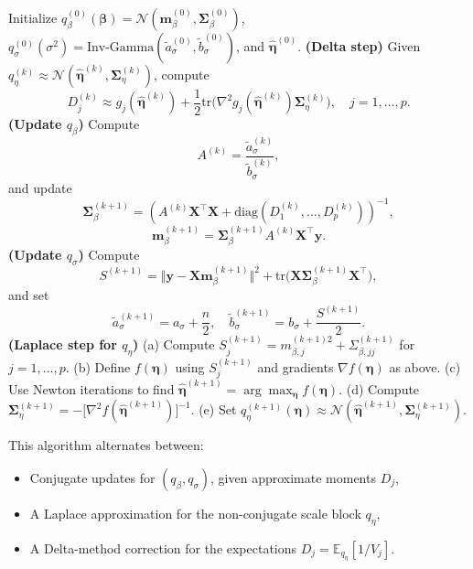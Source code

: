 \documentclass[11pt]{article}
\newcommand{\vect}[1]{\boldsymbol{#1}}
\newcommand{\mat}[1]{\mathbf{#1}}
\newcommand{\E}{\mathbb{E}}
\newcommand{\IG}{\mathrm{Inv\text{-}Gamma}}
\newcommand{\N}{\mathcal{N}}
\begin{document}
\begin{algorithm}[h]
\caption{VB with Laplace--Delta (VB--LD) for Regularized Horseshoe Regression}
\begin{algorithmic}[1]
\State Initialize $q_\beta^{(0)}(\vect{\beta}) = \N(\vect{m}_\beta^{(0)},\mat{\Sigma}_\beta^{(0)})$, 
       $q_\sigma^{(0)}(\sigma^2) = \IG(\tilde{a}_\sigma^{(0)},\tilde{b}_\sigma^{(0)})$,
       and $\hat{\vect{\eta}}^{(0)}$.
  \State \textbf{(Delta step)} Given $q_\eta^{(k)} \approx \N(\hat{\vect{\eta}}^{(k)},\mat{\Sigma}_\eta^{(k)})$, compute
    \[
      D_j^{(k)} \approx g_j(\hat{\vect{\eta}}^{(k)}) 
      + \frac12 \mathrm{tr}\big(\nabla^2 g_j(\hat{\vect{\eta}}^{(k)}) \mat{\Sigma}_\eta^{(k)}\big),
      \quad j=1,\dots,p.
    \]
  \State \textbf{(Update $q_\beta$)} Compute
    \[
      A^{(k)} = \frac{\tilde{a}_\sigma^{(k)}}{\tilde{b}_\sigma^{(k)}},
    \]
    and update
    \[
      \mat{\Sigma}_\beta^{(k+1)} 
      = \left(A^{(k)}\mat{X}^\top\mat{X} + \mathrm{diag}(D_1^{(k)},\dots,D_p^{(k)})\right)^{-1},
    \]
    \[
      \vect{m}_\beta^{(k+1)} 
      = \mat{\Sigma}_\beta^{(k+1)} A^{(k)} \mat{X}^\top \vect{y}.
    \]
  \State \textbf{(Update $q_\sigma$)} Compute
    \[
      S^{(k+1)} = \Vert \vect{y} - \mat{X}\vect{m}_\beta^{(k+1)} \Vert^2
      + \mathrm{tr}\big(\mat{X}\mat{\Sigma}_\beta^{(k+1)}\mat{X}^\top\big),
    \]
    and set
    \[
      \tilde{a}_\sigma^{(k+1)} = a_\sigma + \frac{n}{2}, \quad
      \tilde{b}_\sigma^{(k+1)} = b_\sigma + \frac{S^{(k+1)}}{2}.
    \]
  \State \textbf{(Laplace step for $q_\eta$)} 
    \Statex \quad (a) Compute $S_j^{(k+1)} = m_{\beta,j}^{(k+1)2} + \Sigma_{\beta,jj}^{(k+1)}$ for $j=1,\dots,p$.
    \Statex \quad (b) Define $f(\vect{\eta})$ using $S_j^{(k+1)}$ and gradients $\nabla f(\vect{\eta})$ as above.
    \Statex \quad (c) Use Newton iterations to find 
      $\displaystyle \hat{\vect{\eta}}^{(k+1)} = \arg\max_{\vect{\eta}} f(\vect{\eta})$.
    \Statex \quad (d) Compute 
      $\mat{\Sigma}_\eta^{(k+1)} = -\big[\nabla^2 f(\hat{\vect{\eta}}^{(k+1)})\big]^{-1}$.
    \Statex \quad (e) Set $q_\eta^{(k+1)}(\vect{\eta}) \approx \N(\hat{\vect{\eta}}^{(k+1)},\mat{\Sigma}_\eta^{(k+1)})$.
\EndFor
\end{algorithmic}
\end{algorithm}

This algorithm alternates between:
\begin{itemize}
  \item Conjugate updates for $(q_\beta,q_\sigma)$, given approximate moments $D_j$,
  \item A Laplace approximation for the non-conjugate scale block $q_\eta$,
  \item A Delta-method correction for the expectations $D_j = \E_{q_\eta}[1/V_j]$.
\end{itemize}
\end{document}
